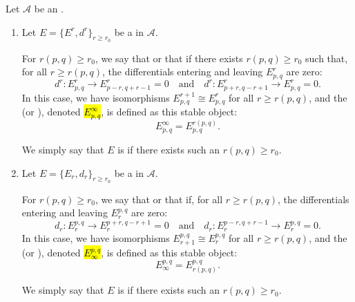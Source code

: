 \begin{definition} \label{definition:stabilize_for_a_spectral_sequence_in_an_abelian_category_and_infinity_page}
    Let $\mathcal{A}$ be an .
    \begin{enumerate}
        \item Let $E = \{E^r, d^r\}_{r \ge r_0}$ be a  in $\mathcal{A}$. 

        For $r(p,q) \geq r_0$, we say that  or that  if there exists $r(p,q) \geq r_0$ such that, for all $r \geq r(p,q)$, the differentials entering and leaving $E^r_{p,q}$ are zero:
        $$d^r: E^r_{p,q} \to E^r_{p-r, q+r-1} = 0 \quad \text{and} \quad d^r: E^r_{p+r, q-r+1} \to E^r_{p,q} = 0.$$
        In this case, we have isomorphisms $E^{r+1}_{p,q} \cong E^r_{p,q}$ for all $r \ge r(p,q)$, and the  (or ), denoted \hl{$E^\infty_{p,q}$}, is defined as this stable object:
        $$E^\infty_{p,q} = E^{r(p,q)}_{p,q}.$$
            
        We simply say that $E$ is  if there exists such an $r(p,q) \geq r_0$.

        \item Let $E = \{E_r, d_r\}_{r \ge r_0}$ be a  in $\mathcal{A}$. 

        For $r(p,q) \geq r_0$, we say that  or that  if, for all $r \geq r(p,q)$, the differentials entering and leaving $E_r^{p,q}$ are zero:
        $$d_r: E_r^{p,q} \to E_r^{p+r, q-r+1} = 0 \quad \text{and} \quad d_r: E_r^{p-r, q+r-1} \to E_r^{p,q} = 0.$$
        In this case, we have isomorphisms $E_{r+1}^{p,q} \cong E_r^{p,q}$ for all $r \ge r(p,q)$, and the  (or ), denoted \hl{$E_\infty^{p,q}$}, is defined as this stable object:
        $$E_\infty^{p,q} = E_{r(p,q)}^{p,q}.$$

    We simply say that $E$ is  if there exists such an $r(p,q) \geq r_0$.
    \end{enumerate}
\end{definition}